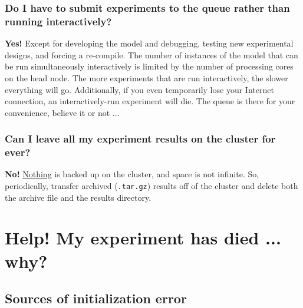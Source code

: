 \documentclass[11pt,fleqn]{book} %
\begin{document}
%
\subsubsection{Do I have to submit experiments to the queue rather than running interactively?}

\textbf{Yes!} Except for developing the model and debugging, testing new experimental designs, and forcing a re-compile. The number of instances of the model that can be run simultaneously interactively is limited by the number of processing cores on the head node. The more experiments that are run interactively, the slower everything will go. Additionally, if you even temporarily lose your Internet connection, an interactively-run experiment will die. The queue is there for your convenience, believe it or not ...

\subsubsection{Can I leave all my experiment results on the cluster for ever?}

\textbf{No!} \uline{Nothing} is backed up on the cluster, and space is not infinite. So, periodically, transfer archived (\texttt{.tar.gz}) results off of the cluster and delete both the archive file and the results directory.


\newpage


\section{Help! My experiment has died ... why?}

%


\subsection{Sources of initialization error}
\end{document}
